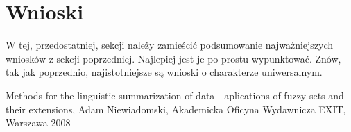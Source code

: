 \documentclass{classrep}
\begin{document}
	\section{Wnioski}
	{\color{blue}W tej, przedostatniej, sekcji należy zamieścić podsumowanie
		najważniejszych wniosków z sekcji poprzedniej. Najlepiej jest je po prostu
		wypunktować. Znów, tak jak poprzednio, najistotniejsze są wnioski o
		charakterze uniwersalnym.}
	
	
	\begin{thebibliography}{}
		Methods for the linguistic summarization of data - aplications of fuzzy sets and their extensions, Adam Niewiadomski, Akademicka Oficyna Wydawnicza EXIT, Warszawa 2008
	\end{thebibliography}
\end{document}
